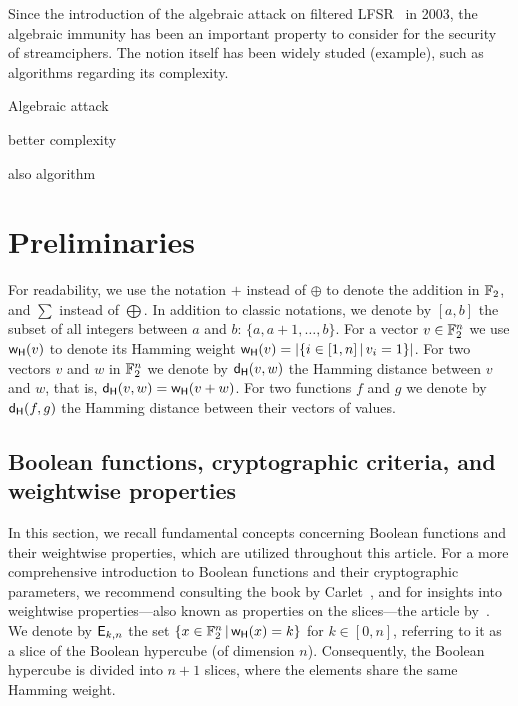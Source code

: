 \documentclass[11pt]{llncs}
\begin{document}
Since the introduction of the algebraic attack on filtered LFSR~\cite{EC:CouMei03} in 2003, the algebraic immunity has been an important property to consider for the security of streamciphers. 
The notion itself has been widely studed (example), such as algorithms regarding its complexity. 






Algebraic attack~\cite{EC:CouMei03}

better complexity~\cite{EC:ACGKMR06}

also algorithm~\cite{FSE:DidTil06}




\section{Preliminaries}\label{sec:prelim}


For readability, we use the notation $+$ instead of 
$\oplus$ to denote the addition in $\mathbb{F}_2$, and $\sum$ instead of $\bigoplus$. 
In addition to classic notations, we denote by $ [a,b] $ the subset of all integers between $a$ and $b$: $\{a, a+1, \ldots,b\}$. 
For a vector $v\in \mathbb{F}_2^n$ we use $\mathsf{w_H}(v)$ to denote its Hamming weight $\mathsf{w_H}(v)=|\{ i \in [1,n] \, | \, v_i=1 \}|$. 
For two vectors $v$ and $w$ in $\mathbb{F}_2^n$ we denote by $\mathsf{d_H}(v,w)$ the Hamming distance between $v$ and $w$, that is, $\mathsf{d_H}(v,w)=\mathsf{w_H}(v+w)$. 
For two functions $f$ and $g$ we denote by $\mathsf{d_H}(f,g)$ the Hamming distance between their vectors of values.


\subsection{Boolean functions, cryptographic criteria, and weightwise properties}
In this section, we recall fundamental concepts concerning Boolean functions and their weightwise properties, which are utilized throughout this article. For a more comprehensive introduction to Boolean functions and their cryptographic parameters, we recommend consulting the book by Carlet~\cite{Carlet20},
and for insights into weightwise properties—also known as properties on the slices—the article by~\cite{TOSC:CarMeaRot17}.
We denote by $\mathsf{E}_{k,n}$ the set $\{x\in \mathbb{F}_2^n \, | \, \mathsf{w_H}(x)=k \}$ for $k \in [0,n]$, referring to it as a slice of the Boolean hypercube (of dimension $n$). 
Consequently, the Boolean hypercube is divided into $n+1$ slices, where the elements share the same Hamming weight.
\end{document}
